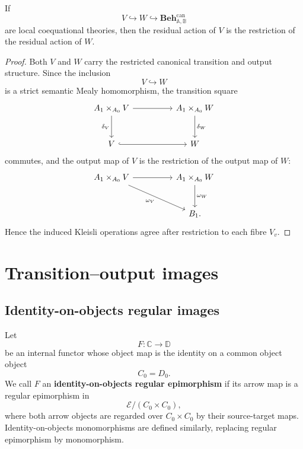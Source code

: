 \begin{lemma}
\label{lem:to-actions-restrict-to-subobjects}
    If
    \[
        V\hookrightarrow W\hookrightarrow
        \mathbf{Beh}^{\mathrm{can}}_{\mathbb A,\mathbb B}
    \]
    are local coequational theories, then the residual action of \(V\) is the
    restriction of the residual action of \(W\).
\end{lemma}

\begin{proof}
    Both \(V\) and \(W\) carry the restricted canonical transition and output
    structure. Since the inclusion
    \[
        V\hookrightarrow W
    \]
    is a strict semantic Mealy homomorphism, the transition square
    \[
    \begin{tikzcd}[column sep=huge, row sep=large]
        A_1\times_{A_0}V
            \arrow[r]
            \arrow[d, "\delta_V"']
        &
        A_1\times_{A_0}W
            \arrow[d, "\delta_W"]
        \\
        V
            \arrow[r, hook]
        &
        W
    \end{tikzcd}
    \]
    commutes, and the output map of \(V\) is the restriction of the output map
    of \(W\):
    \[
    \begin{tikzcd}[column sep=huge, row sep=large]
        A_1\times_{A_0}V
            \arrow[r]
            \arrow[dr, "\omega_V"']
        &
        A_1\times_{A_0}W
            \arrow[d, "\omega_W"]
        \\
        &
        B_1 .
    \end{tikzcd}
    \]
    Hence the induced Kleisli operations agree after restriction to each fibre
    \(V_v\).
\end{proof}

\section{Transition--output images}
\label{sec:transition-output-images}

\subsection{Identity-on-objects regular images}
\label{subsec:to-identity-on-objects-regular-images}

\begin{definition}
\label{def:to-regular-epi-identity-on-objects-categories}
    Let
    \[
        F:\mathbb C\to\mathbb D
    \]
    be an internal functor whose object map is the identity on a common object
    object
    \[
        C_0=D_0.
    \]
    We call \(F\) an \textbf{identity-on-objects regular epimorphism} if its
    arrow map is a regular epimorphism in
    \[
        \mathcal E/(C_0\times C_0),
    \]
    where both arrow objects are regarded over \(C_0\times C_0\) by their
    source-target maps. Identity-on-objects monomorphisms are defined
    similarly, replacing regular epimorphism by monomorphism.
\end{definition}

